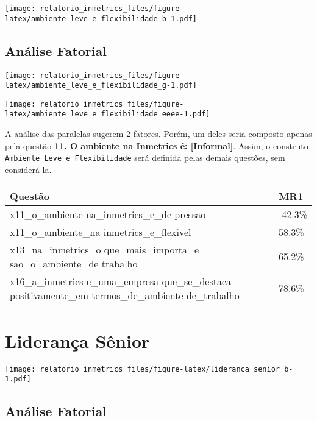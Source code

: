 \documentclass[]{book}
\begin{document}
\texttt{[image: relatorio\_inmetrics\_files/figure-latex/ambiente\_leve\_e\_flexibilidade\_b-1.pdf]}

\hypertarget{analise-fatorial-9}{%
\subsection{Análise Fatorial}\label{analise-fatorial-9}}

\texttt{[image: relatorio\_inmetrics\_files/figure-latex/ambiente\_leve\_e\_flexibilidade\_g-1.pdf]}

\texttt{[image: relatorio\_inmetrics\_files/figure-latex/ambiente\_leve\_e\_flexibilidade\_eeee-1.pdf]}

A análise das paralelas sugerem 2 fatores. Porém, um deles seria composto apenas pela questão \textbf{11. O ambiente na Inmetrics é: {[}Informal{]}}. Assim, o construto \texttt{Ambiente\ Leve\ e\ Flexibilidade} será definida pelas demais questões, sem considerá-la.

\begin{table}[H]
\centering\begingroup\fontsize{12}{14}\selectfont

\begin{tabular}{>{\raggedright\arraybackslash}p{20em}l}
\toprule
Questão & MR1\\
\midrule
x11\_o\_ambiente
na\_inmetrics\_e\_de
pressao & -42.3\%\\
x11\_o\_ambiente\_na
inmetrics\_e\_flexivel & 58.3\%\\
x13\_na\_inmetrics\_o
que\_mais\_importa\_e
sao\_o\_ambiente\_de
trabalho & 65.2\%\\
x16\_a\_inmetrics
e\_uma\_empresa
que\_se\_destaca
positivamente\_em
termos\_de\_ambiente
de\_trabalho & 78.6\%\\
\bottomrule
\end{tabular}
\endgroup{}
\end{table}

\hypertarget{lideranca-senior}{%
\section{Liderança Sênior}\label{lideranca-senior}}

\texttt{[image: relatorio\_inmetrics\_files/figure-latex/lideranca\_senior\_b-1.pdf]}

\hypertarget{analise-fatorial-10}{%
\subsection{Análise Fatorial}\label{analise-fatorial-10}}
\end{document}
